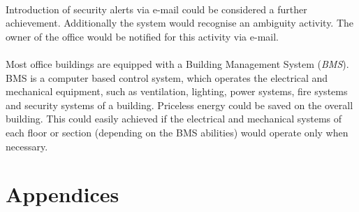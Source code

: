 \documentclass[12pt,a4paper]{report}
\begin{document}
\ \\
Introduction of security alerts via e-mail could be considered a further achievement. Additionally the system would recognise an ambiguity activity. The owner of the office would be notified for this activity via e-mail.\\
\ \\
Most office buildings are equipped with a Building Management System (\textit{BMS}). BMS is a computer based control system, which  operates the electrical and mechanical equipment, such as ventilation, lighting, power systems, fire systems and security systems of a building. Priceless energy could be saved on the overall building. This could easily achieved if the electrical and mechanical systems of each floor or section (depending on the BMS abilities) would operate only when necessary.
%
\newpage
%


%
\newpage
%
\chapter*{Appendices}
%
\end{document}
